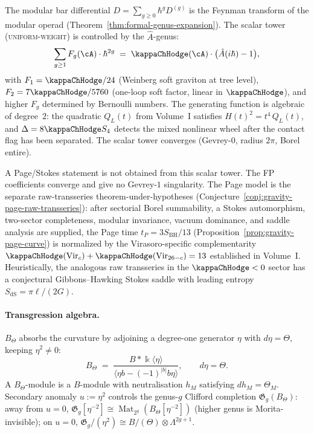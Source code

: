 The modular bar differential $D = \sum_{g \ge 0} \hbar^g D^{(g)}$
is the Feynman transform of the modular operad
(Theorem~\ref{thm:formal-genus-expansion}). The scalar tower
\textup{(\textsc{uniform-weight})} is controlled by the
$\hat{A}$-genus:
\[
\sum_{g \ge 1} F_g(\cA) \cdot \hbar^{2g}
\;=\;
\kappaChHodge(\cA)\cdot\bigl(\hat{A}(i\hbar) - 1\bigr),
\]
with $F_1 = \kappaChHodge/24$ (Weinberg soft graviton at
tree level), $F_2 = 7\kappaChHodge/5760$ (one-loop soft
factor, linear in $\kappaChHodge$), and higher $F_g$
determined by Bernoulli numbers.
The generating function is algebraic of degree~$2$: the quadratic
$Q_L(t)$ from Volume~I satisfies $H(t)^2 = t^4\,Q_L(t)$, and
$\Delta = 8\kappaChHodge S_4$ detects the mixed nonlinear
wheel after the contact flag has been separated. The scalar tower converges (Gevrey-$0$, radius
$2\pi$, Borel entire).

A Page/Stokes statement is not obtained from this scalar tower. The
FP coefficients converge and give no Gevrey-$1$ singularity. The
Page model is the separate raw-transseries theorem-under-hypotheses
(Conjecture~\ref{conj:gravity-page-raw-transseries}): after
sectorial Borel summability, a Stokes automorphism, two-sector
completeness, modular invariance, vacuum dominance, and saddle
analysis are supplied, the Page time
$t_P = 3 S_{\mathrm{BH}}/13$
(Proposition~\ref{prop:gravity-page-curve}) is normalized by the
Virasoro-specific complementarity
$\kappaChHodge(\mathrm{Vir}_c) +
\kappaChHodge(\mathrm{Vir}_{26-c}) = 13$ established in
Volume~I. Heuristically, the analogous raw transseries in the
$\kappaChHodge < 0$ sector has a conjectural Gibbons--Hawking
Stokes saddle with leading entropy
$S_{\mathrm{dS}} = \pi\ell/(2G)$.

\paragraph{Transgression algebra.}
$B_\Theta$ absorbs the curvature by adjoining a degree-one
generator $\eta$ with $d\eta = \Theta$, keeping
$\eta^2 \neq 0$:
\[
B_\Theta
\;=\;
\frac{B * \Bbbk\langle\eta\rangle}
{\langle \eta b - (-1)^{|b|} b\eta \rangle},
\qquad d\eta = \Theta.
\]
A $B_\Theta$-module is a $B$-module with neutralisation
$h_M$ satisfying $dh_M = \Theta_M$. Secondary anomaly
$u := \eta^2$ controls the genus-$g$ Clifford completion
$\mathfrak{G}_g(B_\Theta)$: away from $u = 0$,
$\mathfrak{G}_g[\eta^{-2}] \cong
\operatorname{Mat}_{2^g}(B_\Theta[\eta^{-2}])$
(higher genus is Morita-invisible); on $u = 0$,
$\mathfrak{G}_g/(\eta^2) \cong B/(\Theta) \otimes \Lambda^{2g+1}$.

